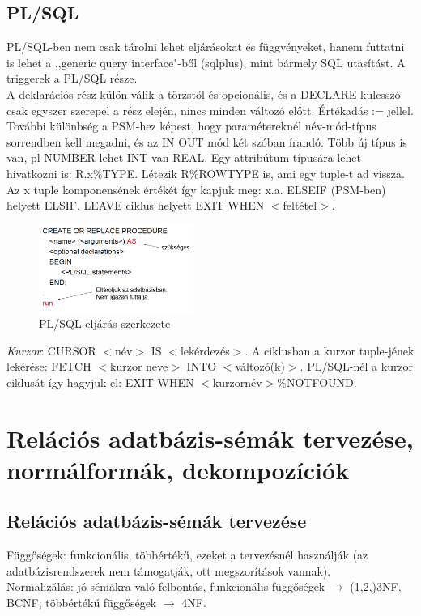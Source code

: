 \documentclass[margin=0px]{article}
\begin{document}
 	
 	\subsection{PL/SQL}
	
	PL/SQL-ben nem csak tárolni lehet eljárásokat és függvényeket, hanem futtatni is lehet a ,,generic query interface"-ből (sqlplus), mint bármely SQL utasítást. A triggerek a PL/SQL része. \\
	A deklarációs rész külön válik a törzstől és opcionális, és a DECLARE kulcsszó csak egyszer szerepel a rész elején, nincs minden változó előtt. Értékadás := jellel. További különbség a PSM-hez képest, hogy paramétereknél név-mód-típus sorrendben kell megadni, és az IN OUT mód két szóban írandó. Több új típus is van, pl NUMBER lehet INT van REAL. Egy attribútum típusára lehet hivatkozni is: R.x\%TYPE. Létezik R\%ROWTYPE is,  ami egy tuple-t ad vissza. Az x tuple komponensének értékét így kapjuk meg: x.a.  ELSEIF (PSM-ben) helyett ELSIF. LEAVE ciklus helyett EXIT WHEN $<$feltétel$>$.
	\begin{figure}[H]
		\centering
		\includegraphics[width=0.45\textwidth]{img/plsql1.png}
		\caption{PL/SQL eljárás szerkezete}
	\end{figure}
	\textit{Kurzor}: CURSOR $<$név$>$ IS $<$lekérdezés$>$. A ciklusban a kurzor tuple-jének lekérése: FETCH $<$kurzor neve$>$ INTO $<$változó(k)$>$. PL/SQL-nél a kurzor ciklusát így hagyjuk el: EXIT WHEN $<$kurzornév$>$\%NOTFOUND.
	\section{Relációs adatbázis-sémák tervezése, normálformák, dekompozíciók}
	
	\subsection{Relációs adatbázis-sémák tervezése}
	
	Függőségek: funkcionális, többértékű, ezeket a tervezésnél használják (az adatbázisrendszerek nem támogatják, ott megszorítások vannak). \\
	Normalizálás: jó sémákra való felbontás, funkcionális függőségek $\to$ (1,2,)3NF, BCNF; többértékű függőségek $\to$ 4NF.
	
\end{document}
